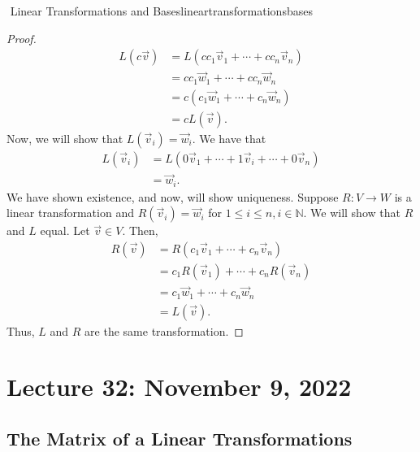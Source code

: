 \begin{theorem}{\Stop\,\,Linear Transformations and Bases}{lineartransformationsbases}
\begin{proof}
\begin{align*}
                    L(c\vec{v})&=L(cc_1\vec{v}_1+\cdots+cc_n\vec{v}_n) \\
                    &=cc_1\vec{w}_1+\cdots+cc_n\vec{w}_n \\
                    &=c(c_1\vec{w}_1+\cdots+c_n\vec{w}_n) \\
                    &=cL(\vec{v}).
                \end{align*}
                Now, we will show that \(L(\vec{v}_i)=\vec{w}_i\). We have that
                \begin{align*}
                    L(\vec{v}_i)&=L(0\vec{v}_1+\cdots+1\vec{v}_i+\cdots+0\vec{v}_n) \\
                    &=\vec{w}_i.
                \end{align*}
                We have shown existence, and now, will show uniqueness. Suppose \(R:V\to W\) is a linear transformation and \(R(\vec{v}_i)=\vec{w}_i\) for \(1\leq i\leq n, i\in \mathbb{N}\). We will show that \(R\) and \(L\) equal. Let \(\vec{v}\in V\). Then,
                \begin{align*}
                    R(\vec{v})&=R(c_1\vec{v}_1+\cdots+c_n\vec{v}_n) \\
                    &=c_1R(\vec{v}_1)+\cdots+c_nR(\vec{v}_n) \\
                    &=c_1\vec{w}_1+\cdots+c_n\vec{w}_n \\
                    &=L(\vec{v}).
                \end{align*}
                Thus, \(L\) and \(R\) are the same transformation.
            \end{proof}
            
            
        \end{theorem}

\pagebreak

\section{Lecture 32: November 9, 2022}

    \subsection{The Matrix of a Linear Transformations}

